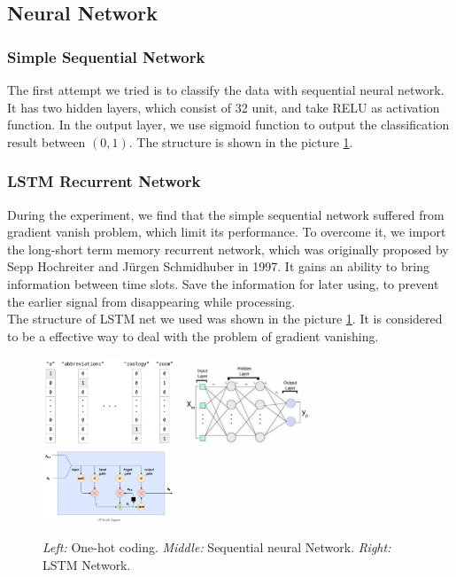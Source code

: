 \documentclass{article}
\begin{document}
\subsection{Neural Network}
\subsubsection{Simple Sequential Network}
The first attempt we tried is to classify the data with sequential neural network. It has two hidden layers, which consist of 32 unit, and take RELU as activation function. In the output layer, we use sigmoid function to output the classification result between $(0,1)$. The structure is shown in the picture \ref{fig:result1}.
\subsubsection{LSTM Recurrent Network}
During the experiment, we find that the simple sequential network suffered from gradient vanish problem, which limit its performance. To overcome it, we import the long-short term memory recurrent network, which was originally proposed by Sepp Hochreiter and Jürgen Schmidhuber in 1997. It gains an ability to bring information between time slots. Save the information for later using, to prevent the earlier signal from disappearing while processing.\\
The structure of LSTM net we used was shown in the picture \ref{fig:result1}. It is considered to be a effective way to deal with the problem of gradient vanishing.

\begin{figure}[h]
	\centering
	\includegraphics[width=4cm]{fig/oneHot.jpg}
	\includegraphics[width=4cm]{fig/snn.jpg}
	\includegraphics[width=4cm]{fig/lstm.jpg}
	\caption{\emph{Left:} One-hot coding. \emph{Middle:} Sequential neural Network. \emph{Right:} LSTM Network.}
	\label{fig:result1}
\end{figure}
\end{document}

